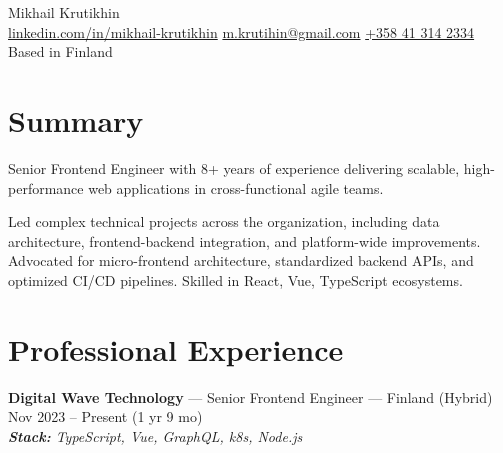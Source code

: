 \documentclass[a4paper,9pt]{article}
\begin{document}
\pagestyle{empty}

\begin{center}
    {\Huge Mikhail Krutikhin}\\
    \href{https://linkedin.com/in/mikhail-krutikhin}{linkedin.com/in/mikhail-krutikhin} \quad
    \href{mailto:m.krutihin@gmail.com}{m.krutihin@gmail.com} \quad
    \href{tel:+358413142334}{+358 41 314 2334} \quad
    Based in Finland
\end{center}

\section{Summary}
Senior Frontend Engineer with 8+ years of experience delivering scalable, high-performance web applications in cross-functional agile teams.

Led complex technical projects across the organization, including data architecture, frontend-backend integration, and platform-wide improvements. Advocated for micro-frontend architecture, standardized backend APIs, and optimized CI/CD pipelines. Skilled in React, Vue, TypeScript ecosystems.

\section{Professional Experience}

\textbf{Digital Wave Technology} --- Senior Frontend Engineer --- Finland (Hybrid) \hfill Nov 2023 -- Present (1 yr 9 mo)\\
\textit{\textbf{Stack:} TypeScript, Vue, GraphQL, k8s, Node.js}
\end{document}
